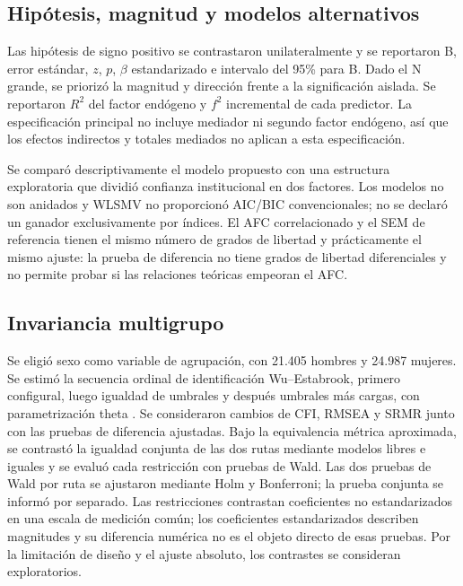 \documentclass[11pt,letterpaper]{article}
\begin{document}
\subsection{Hipótesis, magnitud y modelos alternativos}

Las hipótesis de signo positivo se contrastaron unilateralmente y se reportaron B, error estándar, \(z\), \(p\), \(\beta\) estandarizado e intervalo del 95\% para B. Dado el N grande, se priorizó la magnitud y dirección frente a la significación aislada. Se reportaron \(R^2\) del factor endógeno y \(f^2\) incremental de cada predictor. La especificación principal no incluye mediador ni segundo factor endógeno, así que los efectos indirectos y totales mediados no aplican a esta especificación.

Se comparó descriptivamente el modelo propuesto con una estructura exploratoria que dividió confianza institucional en dos factores. Los modelos no son anidados y WLSMV no proporcionó AIC/BIC convencionales; no se declaró un ganador exclusivamente por índices. El AFC correlacionado y el SEM de referencia tienen el mismo número de grados de libertad y prácticamente el mismo ajuste: la prueba de diferencia no tiene grados de libertad diferenciales y no permite probar si las relaciones teóricas empeoran el AFC.

\subsection{Invariancia multigrupo}

Se eligió sexo como variable de agrupación, con 21.405 hombres y 24.987 mujeres. Se estimó la secuencia ordinal de identificación Wu--Estabrook, primero configural, luego igualdad de umbrales y después umbrales más cargas, con parametrización theta \citep{WuEstabrook2016,Jorgensen2022}. Se consideraron cambios de CFI, RMSEA y SRMR junto con las pruebas de diferencia ajustadas. Bajo la equivalencia métrica aproximada, se contrastó la igualdad conjunta de las dos rutas mediante modelos libres e iguales y se evaluó cada restricción con pruebas de Wald. Las dos pruebas de Wald por ruta se ajustaron mediante Holm y Bonferroni; la prueba conjunta se informó por separado. Las restricciones contrastan coeficientes no estandarizados en una escala de medición común; los coeficientes estandarizados describen magnitudes y su diferencia numérica no es el objeto directo de esas pruebas. Por la limitación de diseño y el ajuste absoluto, los contrastes se consideran exploratorios.
\end{document}
